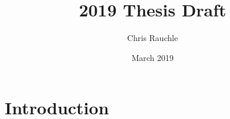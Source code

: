 \documentclass{article}
\title{2019 Thesis Draft}
\author{Chris Rauchle}
\date{March 2019}
\begin{document}
\maketitle

\section{Introduction}
\end{document}
